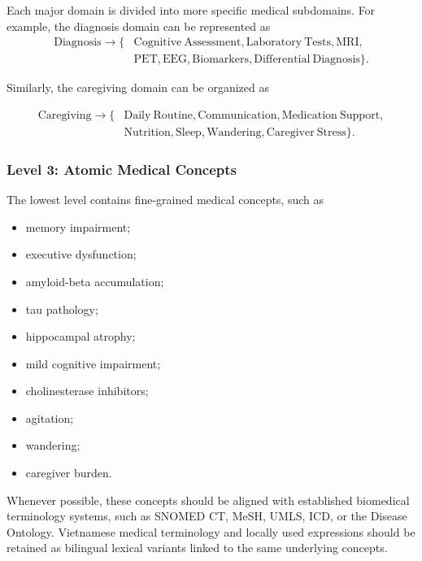 \documentclass{article}
\begin{document}
Each major domain is divided into more specific medical subdomains. 
For example, the diagnosis domain can be represented as
\begin{equation}
\begin{split}
    \mathrm{Diagnosis} \rightarrow
    \{&
    \mathrm{Cognitive\ Assessment},
    \mathrm{Laboratory\ Tests},
    \mathrm{MRI},\\
    &\mathrm{PET},
    \mathrm{EEG},
    \mathrm{Biomarkers},
    \mathrm{Differential\ Diagnosis}
    \}.
\end{split}
\end{equation}

Similarly, the caregiving domain can be organized as

\begin{equation}
\begin{split}
    \mathrm{Caregiving} \rightarrow
    \{&
    \mathrm{Daily\ Routine},
    \mathrm{Communication},
    \mathrm{Medication\ Support},\\
    &\mathrm{Nutrition},
    \mathrm{Sleep},
    \mathrm{Wandering},
    \mathrm{Caregiver\ Stress}
    \}.
\end{split}
\end{equation}

\subsubsection{Level 3: Atomic Medical Concepts}

The lowest level contains fine-grained medical concepts, such as

\begin{itemize}
    \item memory impairment;
    \item executive dysfunction;
    \item amyloid-beta accumulation;
    \item tau pathology;
    \item hippocampal atrophy;
    \item mild cognitive impairment;
    \item cholinesterase inhibitors;
    \item agitation;
    \item wandering;
    \item caregiver burden.
\end{itemize}

Whenever possible, these concepts should be aligned with established 
biomedical terminology systems, such as SNOMED CT, MeSH, UMLS, ICD, 
or the Disease Ontology. Vietnamese medical terminology and locally used 
expressions should be retained as bilingual lexical variants linked to the 
same underlying concepts.
\end{document}
